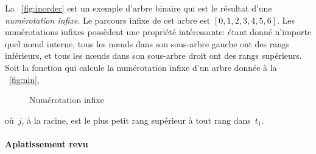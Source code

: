 La \fig~\vref{fig:inorder} est un exemple d'arbre binaire qui est le
résultat d'une \emph{numérotation infixe}. Le parcours infixe de cet arbre est
\([0,1,2,3,4,5,6]\). Les numérotations infixes possèdent une propriété
intéressante: étant donné n'importe quel nœud interne, tous les
nœuds dans son sous-arbre gauche ont des rangs inférieurs, et tous
les nœuds dans son sous-arbre droit ont des rangs supérieurs.
Soit  la
fonction qui calcule la numérotation infixe d'un arbre donnée à la
\fig~\vref{fig:nin},
\begin{figure}
\centering
{}
\caption{Numérotation infixe}
\label{fig:nin}
\end{figure}
où~\(j\), à la racine, est le plus petit rang supérieur à tout
rang dans~\(t_1\).

\paragraph{Aplatissement revu}
\label{par:rotation}

